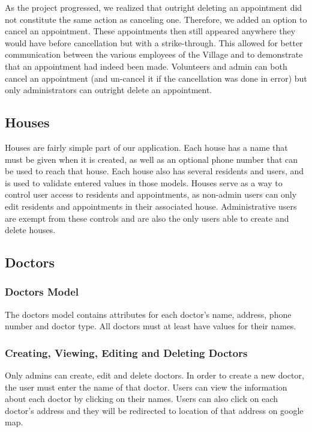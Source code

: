 \documentclass{sig-alternate}
\begin{document}
As the project progressed, we realized that outright deleting an appointment did not constitute the same action as canceling one.  Therefore, we added an option to cancel an appointment.  These appointments then still appeared anywhere they would have before cancellation but with a strike-through.  This allowed for better communication between the various employees of the Village and to demonstrate that an appointment had indeed been made.  Volunteers and admin can both cancel an appointment (and un-cancel it if the cancellation was done in error) but only administrators can outright delete an appointment.      

\subsection{Houses}
Houses are fairly simple part of our application. Each house has a name that must be given when it is created, as well as an optional phone number that can be used to reach that house. Each house also has several residents and users, and is used to validate entered values in those models. Houses serve as a way to control user access to residents and appointments, as non-admin users can only edit residents and appointments in their associated house. Administrative users are exempt from these controls and are also the only users able to create and delete houses.

\subsection{Doctors}

\subsubsection{Doctors Model}
The doctors model contains attributes for each doctor’s name, address, phone number and doctor type. All doctors must at least have values for their names. 

\subsubsection{Creating, Viewing, Editing and Deleting Doctors}
Only admins can create, edit and delete doctors. In order to create a new doctor, the user must enter the name of that doctor. Users can view the information about each doctor by clicking on their names. Users can also click on each doctor’s address and they will be redirected to location of that address on google map. 
\end{document}
